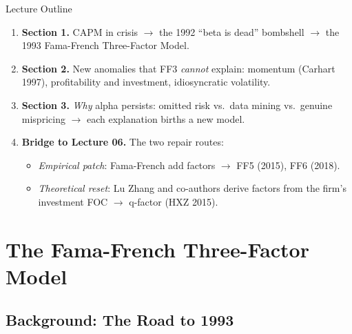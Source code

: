 \documentclass{beamer}
\begin{document}
\begin{frame}{Lecture Outline}
	\begin{enumerate}
		\item \textbf{Section 1.} CAPM in crisis $\rightarrow$ the 1992 ``beta is dead'' bombshell $\rightarrow$ the 1993 Fama-French Three-Factor Model.
		\item \textbf{Section 2.} New anomalies that FF3 \textit{cannot} explain: momentum (Carhart 1997), profitability and investment, idiosyncratic volatility.
		\item \textbf{Section 3.} \textit{Why} alpha persists: omitted risk vs.\ data mining vs.\ genuine mispricing $\rightarrow$ each explanation births a new model.
		\item \textbf{Bridge to Lecture 06.} The two repair routes:
		\begin{itemize}
			\item \textit{Empirical patch}: Fama-French add factors $\rightarrow$ FF5 (2015), FF6 (2018).
			\item \textit{Theoretical reset}: Lu Zhang and co-authors derive factors from the firm's investment FOC $\rightarrow$ q-factor (HXZ 2015).
		\end{itemize}
	\end{enumerate}
\end{frame}

\section{The Fama-French Three-Factor Model}

\subsection{Background: The Road to 1993}
\end{document}
